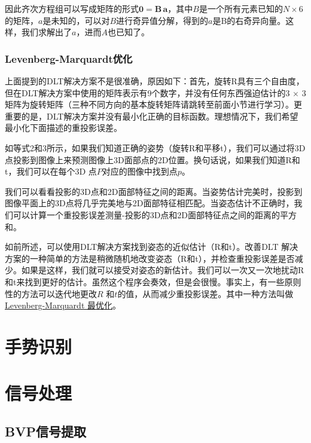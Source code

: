 因此齐次方程组可以写成矩阵的形式${\mathbf  {0}}={\mathbf  {B}}\,{\mathbf  {a}}$，其中$B$是一个所有元素已知的$N \times 6$ 的矩阵，$a$是未知的，可以对$B$进行奇异值分解，得到的$a$是B的右奇异向量。这样，我们求解出了$a$，进而$A$也已知了。\\

\subsubsection{Levenberg-Marquardt优化}

上面提到的DLT解决方案不是很准确，原因如下：首先，旋转R具有三个自由度，但在DLT解决方案中使用的矩阵表示有9个数字，并没有任何东西强迫估计的3 $\times$ 3 矩阵为旋转矩阵（三种不同方向的基本旋转矩阵请跳转至前面小节进行学习）。更重要的是，DLT解决方案并没有最小化正确的目标函数。理想情况下，我们希望最小化下面描述的重投影误差。

如等式2和3所示，如果我们知道正确的姿势（旋转R和平移t），我们可以通过将3D点投影到图像上来预测图像上3D面部点的2D位置。换句话说，如果我们知道R和t，我们可以在每个3D 点$P$对应的图像中找到点$p$。

我们可以看看投影的3D点和2D面部特征之间的距离。当姿势估计完美时，投影到图像平面上的3D点将几乎完美地与2D面部特征相匹配。当姿态估计不正确时，我们可以计算一个重投影误差测量-投影的3D点和2D面部特征点之间的距离的平方和。

如前所述，可以使用DLT解决方案找到姿态的近似估计（R和t）。改善DLT 解决方案的一种简单的方法是稍微随机地改变姿态（R和t），并检查重投影误差是否减少。如果是这样，我们就可以接受对姿态的新估计。我们可以一次又一次地扰动R和t来找到更好的估计。虽然这个程序会奏效，但是会很慢。事实上，有一些原则性的方法可以迭代地更改$R$ 和$t$的值，从而减少重投影误差。其中一种方法叫做\href{https://en.wikipedia.org/wiki/Levenberg%E2%80%93Marquardt_algorithm}{Levenberg-Marquardt 最优化}。

\section{手势识别}



\section{信号处理}

\subsection{BVP信号提取}

